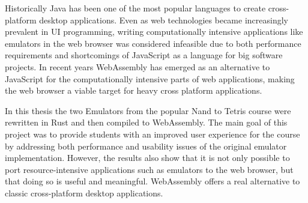Historically Java has been one of the most popular languages to create cross-platform desktop applications. Even as web technologies became increasingly prevalent in UI programming, writing computationally intensive applications like emulators in the web browser was considered infeasible due to both performance requirements and shortcomings of JavaScript as a language for big software projects.
In recent years WebAssembly has emerged as an alternative to JavaScript for the computationally intensive parts of web applications, making the web browser a viable target for heavy cross platform applications.

In this thesis the two Emulators from the popular Nand to Tetris course were rewritten in Rust and then compiled to WebAssembly.
The main goal of this project was to provide students with an improved user experience for the course by addressing both performance and usability issues of the original emulator implementation. However, the results also show that it is not only possible to port resource-intensive applications such as emulators to the web browser, but that doing so is useful and meaningful. WebAssembly offers a real alternative to classic cross-platform desktop applications.
